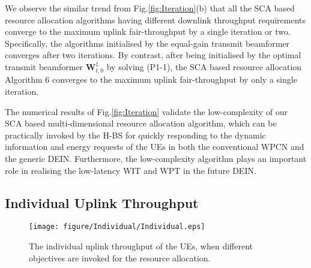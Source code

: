 \documentclass[12pt,draftcls,onecolumn,journal]{IEEEtran}
\begin{document}
We observe the similar trend from Fig.\ref{fig:Iteration}(b) that all the SCA based resource allocation algorithms having different downlink throughput requirements converge to the maximum uplink fair-throughput by a single iteration or two. Specifically, the algorithms initialised by the equal-gain transmit beamformer converges after two iterations. By contrast, after being initialised by the optimal transmit beamformer $\mathbf{W}_{t,0}^{\ddagger}$ by solving (P1-1), the SCA based resource allocation Algorithm 6 converges to the maximum uplink fair-throughput by only a single iteration.

The numerical results of Fig.\ref{fig:Iteration} validate the low-complexity of our SCA based multi-dimensional resource allocation algorithm, which can be practically invoked by the H-BS for quickly responding to the dynamic information and energy requests of the UEs in  both the conventional WPCN and the generic DEIN. Furthermore, the low-complexity algorithm plays an important role in realising the low-latency WIT and WPT in the future DEIN.

\subsection{Individual Uplink Throughput}

\begin{figure}[!t]
\centering
\texttt{[image: figure/Individual/Individual.eps]}
\setlength{\abovecaptionskip}{0pt}
\setlength{\belowcaptionskip}{0pt}\caption{The individual uplink throughput of the UEs, when different objectives are invoked for the resource allocation.}
\label{fig:Individual}
\end{figure}
\end{document}

